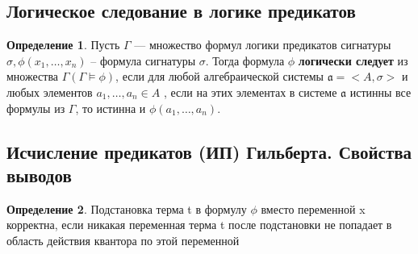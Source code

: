 \documentclass[a4paper]{article}
\theoremstyle{definition}
\newtheorem*{definition}{Определение}
\theoremstyle{remark}
\begin{document}
    \subsection{Логическое следование в логике предикатов}
    \begin{definition}
        Пусть $\Gamma$ — множество формул логики предикатов сигнатуры $\sigma, \phi(x_1, \dots, x_n)$ -- формула 
        сигнатуры $\sigma$. Тогда формула $\phi$ \textbf{логически следует} из множества $\Gamma (\Gamma \models \phi)$, если для любой 
        алгебраической системы $\mathfrak{a} = <A, \sigma>$ и любых элементов $a_1, \dots, a_n \in A$ , если на этих элементах 
        в системе $\mathfrak{a}$ истинны все формулы из $\Gamma$, то истинна и $\phi(a_1, \dots, a_n)$.
    \end{definition}
    \subsection{Исчисление предикатов (ИП)  Гильберта. Свойства выводов}
	\begin{definition}
		Подстановка терма t в формулу $\phi$ вместо переменной x корректна, если никакая переменная терма t после подстановки не попадает в область действия квантора по этой переменной
	\end{definition}
\end{document}
